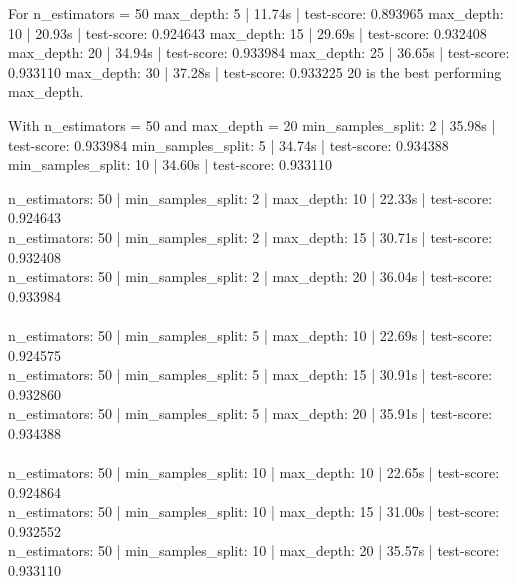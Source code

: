 \documentclass[12pt, letterpaper]{article}
\begin{document}
For n_estimators = 50
max_depth: 5 | 11.74s | test-score: 0.893965
max_depth: 10 | 20.93s | test-score: 0.924643
max_depth: 15 | 29.69s | test-score: 0.932408
max_depth: 20 | 34.94s | test-score: 0.933984
max_depth: 25 | 36.65s | test-score: 0.933110
max_depth: 30 | 37.28s | test-score: 0.933225
20 is the best performing max_depth.

With n_estimators = 50 and max_depth = 20
min_samples_split: 2 | 35.98s | test-score: 0.933984
min_samples_split: 5 | 34.74s | test-score: 0.934388
min_samples_split: 10 | 34.60s | test-score: 0.933110


n_estimators: 50 | min_samples_split: 2 | max_depth: 10 | 22.33s | test-score: 0.924643 \\
n_estimators: 50 | min_samples_split: 2 | max_depth: 15 | 30.71s | test-score: 0.932408 \\
n_estimators: 50 | min_samples_split: 2 | max_depth: 20 | 36.04s | test-score: 0.933984 \\ \\
n_estimators: 50 | min_samples_split: 5 | max_depth: 10 | 22.69s | test-score: 0.924575 \\
n_estimators: 50 | min_samples_split: 5 | max_depth: 15 | 30.91s | test-score: 0.932860 \\
n_estimators: 50 | min_samples_split: 5 | max_depth: 20 | 35.91s | test-score: 0.934388 \\ \\
n_estimators: 50 | min_samples_split: 10 | max_depth: 10 | 22.65s | test-score: 0.924864 \\
n_estimators: 50 | min_samples_split: 10 | max_depth: 15 | 31.00s | test-score: 0.932552 \\
n_estimators: 50 | min_samples_split: 10 | max_depth: 20 | 35.57s | test-score: 0.933110 \\ \\ \\
\end{document}
